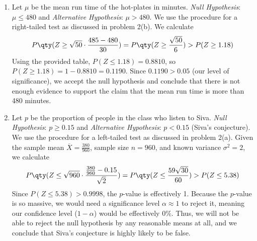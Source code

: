 \documentclass[12pt,english]{article}\usepackage[]{graphicx}\usepackage[]{xcolor}
\begin{document}
\begin{enumerate}[label=\arabic*.]
	\item Let $\mu$ be the mean run time of the hot-plates in minutes. 
	\textit{Null Hypothesis}: $\mu\leq 480$ and \textit{Alternative Hypothesis}: $\mu>480$.
	We use the procedure for a right-tailed test as discussed in problem 2(b). We calculate
	\[
		P\qty(Z\geq\sqrt{50}\cdot\frac{485-480}{30}) = P\qty(Z\geq\frac{\sqrt{50}}{6})>P(Z\geq 1.18)
	\]
	Using the provided table, $P(Z\leq 1.18) = 0.8810$, so $P(Z\geq 1.18) = 1 - 0.8810 = 0.1190$. 
	Since $0.1190 > 0.05$ (our level of significance), we accept the null hypothesis and conclude that there is not enough evidence to support the claim that the mean run time is more than 480 minutes.
	
	\item Let $p$ be the proportion of people in the class who listen to Siva.
	\textit{Null Hypothesis}: $p\geq 0.15$ and \textit{Alternative Hypothesis}: $p<0.15$ (Siva's conjecture).
	We use the procedure for a left-tailed test as discussed in problem 2(a). Given the sample mean $\overline{X} = \frac{380}{960}$, sample size $n = 960$, and known variance $\sigma^2 = 2$, we calculate
	\[
		P\qty(Z\leq\sqrt{960}\cdot\frac{\frac{380}{960}-0.15}{\sqrt{2}}) = P\qty(Z\leq\frac{59\sqrt{30}}{60}) > P(Z\leq 5.38)
	\]
	Since $P(Z\leq 5.38) > 0.9998$, the $p$-value is effectively 1. Because the $p$-value is so massive, we would need a significance level $\alpha \approx 1$ to reject it, meaning our confidence level ($1-\alpha$) would be effectively $0\%$.
	Thus, we will not be able to reject the null hypothesis by any reasonable means at all, and we conclude that Siva's conjecture is highly likely to be false.
\end{enumerate}
\end{document}
